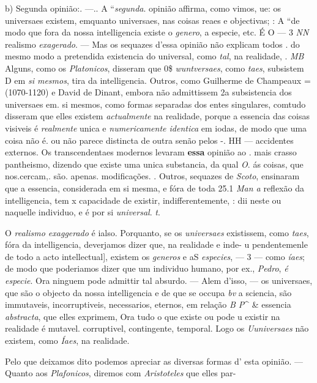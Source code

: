 b) Segunda opinião:. ---.. A “\emph{segunda}. opinião affirma, como vimos, ue: os universaes existem, emquanto universaes, nas coisas reaes e objectivas; : A “de modo que fora da nossa intelligencia existe o \emph{genero}, a especie, etc. É O --- 3 \emph{NN} realismo \emph{exagerado}. --- Mas os sequazes d'essa opinião não explicam todos . do mesmo modo a pretendida existencia do universal, como \emph{tal}, na realidade, . \emph{MB} Alguns, como os \emph{Platonicos}, disseram que 0\$ \emph{wuntversaes}, como \emph{taes}, subsistem D em \emph{si mesmos}, tira da intelligencia. Outros, como Guilherme de Champeaux \textbar{} = (1070-1120) e David de Dinant, embora não admittissem 2a subsistencia dos universaes em. si mesmos, como formas separadas dos entes singulares, comtudo disseram que elles existem \emph{actualmente} na realidade, porque a essencia das coisas visiveis é \emph{realmente} unica e \emph{numericamente identica} em iodas, de modo que uma coisa não é. ou não parece distincta de outra senão pelos -. HH --- accidentes externos. Os transcendentaes modernos levaram \textbf{essa} opinião ao . mais crasso pantheismo, dizendo que existe uma unica substancia, da qual \emph{O}. ás coisas, que nos.cercam,. são. apenas. modificações. . Outros, sequazes de \emph{Scoto}, ensinaram que a essencia, considerada em si mesma, e fóra de toda 25.1 \emph{Man a} reflexão da intelligencia, tem x capacidade de existir, indifferentemente, : dii neste ou naquelle individuo, e é por si \emph{universal}. \emph{t}.

O \emph{realismo exaggerado} é ialso. Porquanto, se os \emph{universaes} existissem, como \emph{taes}, fóra da intelligencia, deverjamos dizer que, na realidade e inde- u pendentemenle de todo a acto intellectual], existem os \emph{generos} e aS \emph{especies}, --- 3 --- como \emph{íaes}; de modo que poderiamos dizer que um individuo humano, por ex., \emph{Pedro}, \emph{é especie}. Ora ninguem pode admittir tal absurdo. --- Alem d'isso, --- os universaes, que são o objecto da nossa intelligencia e de que se occupa \emph{bv} a sciencia, são immutaveis, incorruptiveis, necessarios, eternos, em relação \emph{B P}\textasciicircum{} \& essencia \emph{abstracta}, que elles exprimem, Ora tudo o que existe ou pode u existir na realidade é mutavel. corruptivel, contingente, temporal. Logo os \emph{Uuniversaes} não existem, como \emph{Íaes}, na realidade.

Pelo que deixamos dito podemos apreciar as diversas formas d' esta opinião. --- Quanto aos \emph{Plafonicos}, diremos com \emph{Aristoteles} que elles par-

